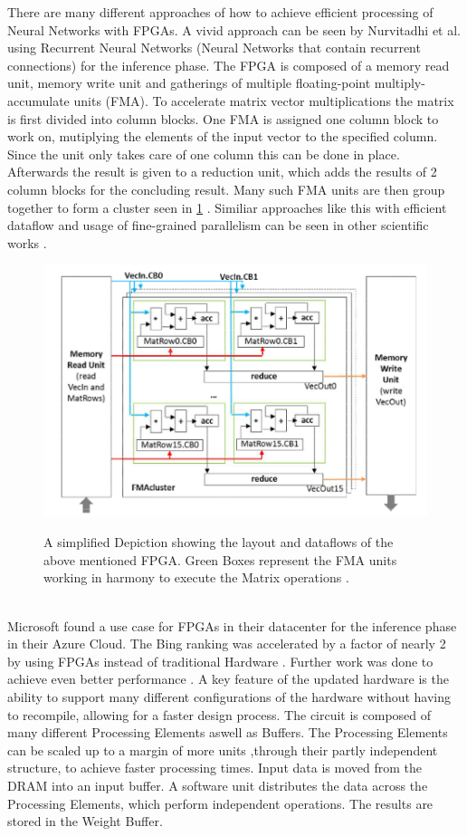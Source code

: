 \documentclass[conference]{IEEEtran}
\begin{document}
There are many different approaches of how to achieve efficient processing of Neural Networks with FPGAs. A vivid approach can be seen by Nurvitadhi et al. \cite{nurvitadhi2016accelerating} using Recurrent Neural Networks (Neural Networks that contain recurrent connections) for the inference phase. 
The FPGA is composed of a memory read unit, memory write unit and gatherings of multiple floating-point multiply-accumulate units (FMA). To accelerate matrix vector multiplications the matrix is first divided into column blocks. One FMA is assigned one column block to work on, mutiplying the elements of the input vector to the specified column. Since the unit only takes care of one column this can be done in place. Afterwards the result is given to a reduction unit, which adds the results of 2 column blocks for the concluding result. Many such FMA units are then group together to form a cluster seen in \ref{fig:fpgahw} . Similiar approaches like this with efficient dataflow and usage of fine-grained parallelism can be seen in other scientific works \cite{qiu2016going} \cite{wang2016dlau}.
\begin{figure}[h]
	\caption{A simplified Depiction showing the layout and dataflows of the above mentioned FPGA. Green Boxes represent the FMA units working in harmony to execute the Matrix operations \cite{nurvitadhi2016accelerating}.}
	\centering
	\includegraphics[width=\linewidth]{pictures/fpga_operations.png}
	\label{fig:fpgahw}
\end{figure}
\\
Microsoft found a use case for FPGAs in their datacenter for the inference phase in their Azure Cloud. The Bing ranking was accelerated by a factor of nearly 2 by using FPGAs instead of traditional Hardware \cite{putnam2014reconfigurable}. Further work was done to achieve even better performance \cite{ovtcharov2015accelerating}. A key feature of the updated hardware is the ability to support many different configurations of the hardware without having to recompile, allowing for a faster design process. The circuit is composed of many different Processing Elements aswell as Buffers. The Processing Elements can be scaled up to a margin of more units ,through their partly independent structure, to achieve faster processing times. Input data is moved from the DRAM into an input buffer. A software unit distributes the data across the Processing Elements, which perform independent operations. The results are stored in the Weight Buffer.
\end{document}

